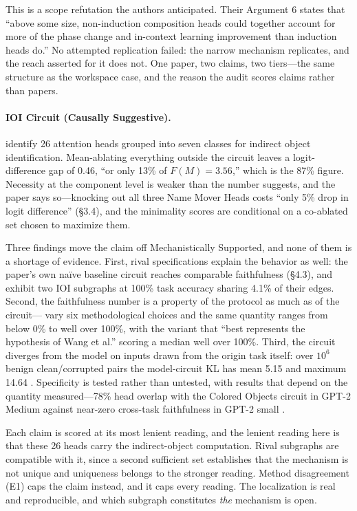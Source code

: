 \documentclass{article}
\begin{document}
This is a scope refutation the authors anticipated. Their Argument 6 states that ``above some size, non-induction composition heads could together account for more of the phase change and in-context learning improvement than induction heads do.'' No attempted replication failed: the narrow mechanism replicates, and the reach asserted for it does not. One paper, two claims, two tiers---the same structure as the workspace case, and the reason the audit scores claims rather than papers.

\paragraph{IOI Circuit (Causally Suggestive).} \citet{wang2023interpretability} identify 26 attention heads grouped into seven classes for indirect object identification. Mean-ablating everything outside the circuit leaves a logit-difference gap of 0.46, ``or only 13\% of $F(M) = 3.56$,'' which is the 87\% figure. Necessity at the component level is weaker than the number suggests, and the paper says so---knocking out all three Name Mover Heads costs ``only 5\% drop in logit difference'' (\S3.4), and the minimality scores are conditional on a co-ablated set chosen to maximize them.

Three findings move the claim off Mechanistically Supported, and none of them is a shortage of evidence. First, rival specifications explain the behavior as well: the paper's own na\"ive baseline circuit reaches comparable faithfulness (\S4.3), and \citet{chen2026circuits} exhibit two IOI subgraphs at 100\% task accuracy sharing 4.1\% of their edges. Second, the faithfulness number is a property of the protocol as much as of the circuit---\citet{miller2024transformer} vary six methodological choices and the same quantity ranges from below 0\% to well over 100\%, with the variant that ``best represents the hypothesis of Wang et al.'' scoring a median well over 100\%. Third, the circuit diverges from the model on inputs drawn from the origin task itself: over $10^6$ benign clean/corrupted pairs the model-circuit KL has mean 5.15 and maximum 14.64 \citep{uitdebos2024adversarial}. Specificity is tested rather than untested, with results that depend on the quantity measured---78\% head overlap with the Colored Objects circuit in GPT-2 Medium \citep{merullo2024circuit} against near-zero cross-task faithfulness in GPT-2 small \citep{hanna2024faith}.

Each claim is scored at its most lenient reading, and the lenient reading here is that these 26 heads carry the indirect-object computation. Rival subgraphs are compatible with it, since a second sufficient set establishes that the mechanism is not unique and uniqueness belongs to the stronger reading. Method disagreement (E1) caps the claim instead, and it caps every reading. The localization is real and reproducible, and which subgraph constitutes \emph{the} mechanism is open.
\end{document}
